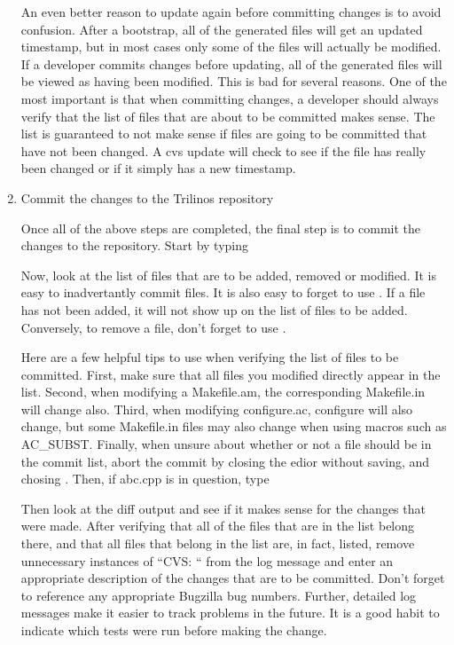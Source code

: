 \documentclass[12pt,relax]{TrilinosDevGuide}
\begin{document}
\begin{enumerate}
An even better reason to update again before committing changes is to avoid 
confusion.  After a bootstrap, all of the generated files will get an updated 
timestamp, but in most cases only some of the files will actually be 
modified.  If a developer commits changes before updating, all of the 
generated files will be viewed as having been modified.  This is bad for 
several reasons.  One of the most important is that when committing changes, a 
developer should always verify that the list of files that are about to be 
committed makes sense.  The list is guaranteed to not make sense if files are 
going to be committed that have not been changed.  A cvs update will check to 
see if the file has really been changed or if it simply has a new timestamp.

\item Commit the changes to the Trilinos repository

Once all of the above steps are completed, the final step is to commit the 
changes to the repository.  Start by typing


Now, look at the list of files that are to be added, removed  or modified.  
It is easy to inadvertantly commit files.  It is also easy to forget to use 
.  If a file has not been added, it will not show up on 
the list of files to be added.  Conversely, to remove a file, don't forget to 
use .  

Here are a few helpful tips to use when verifying the list of files 
to be committed.  First, make sure that all files you modified directly appear 
in the list.  Second, when modifying a Makefile.am, the corresponding 
Makefile.in will change also.  Third, when modifying configure.ac, configure 
will also change, but some Makefile.in files may also change when using macros 
such as AC\_SUBST.  Finally, when unsure about whether or not a 
file should be in the commit list, abort the commit by closing the edior 
without saving, and chosing .  Then, if abc.cpp is in 
question, type 


Then look at the diff output and see if it makes sense for the changes that 
were made.  After verifying that all of the files that are in the list belong 
there, and that all files that belong in the list are, in fact, listed, remove 
unnecessary instances of ``CVS: `` from the log message and enter an 
appropriate description of the changes that are to be committed.  Don't forget 
to reference any appropriate Bugzilla bug numbers.  Further, detailed log 
messages make it easier to track problems in the future.  It is a good habit 
to indicate which tests were run before making the change.


\end{enumerate}
\end{document}
